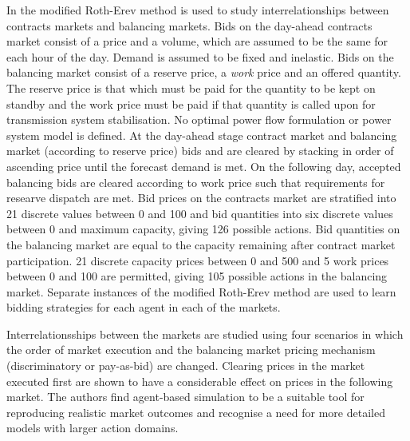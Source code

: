 In \cite{weidlich:06} the modified Roth-Erev method is used to study
interrelationships between contracts markets and balancing markets.  Bids on the
day-ahead contracts market consist of a price and a volume, which are assumed to
be the same for each hour of the day.  Demand is assumed to be fixed and
inelastic.  Bids on the balancing market consist of a reserve price, a
\textit{work} price and an offered quantity.  The reserve price is that which
must be paid for the quantity to be kept on standby and the work price must be
paid if that quantity is called upon for transmission system stabilisation.  No
optimal power flow formulation or power system model is defined.  At the
day-ahead stage contract market and balancing market (according to reserve
price) bids and are cleared by stacking in order of ascending price until the
forecast demand is met.  On the following day, accepted balancing bids are
cleared according to work price such that requirements for researve dispatch
are met.  Bid prices on the contracts market are stratified into 21 discrete
values between 0 and 100 and bid quantities into six discrete values between 0
and maximum capacity, giving 126 possible actions.  Bid quantities on the
balancing market are equal to the capacity remaining after contract market
participation.  21 discrete capacity prices between 0 and 500 and 5 work prices
between 0 and 100 are permitted, giving 105 possible actions in the balancing
market.  Separate instances of the modified Roth-Erev method are used to learn
bidding strategies for each agent in each of the markets.

Interrelationsships between the markets are studied using four scenarios in
which the order of market execution and the balancing market pricing mechanism
(discriminatory or pay-as-bid) are changed.  Clearing prices in the market
executed first are shown to have a considerable effect on prices in the
following market.  The authors find agent-based simulation to be a suitable
tool for reproducing realistic market outcomes and recognise a need for more
detailed models with larger action domains.

